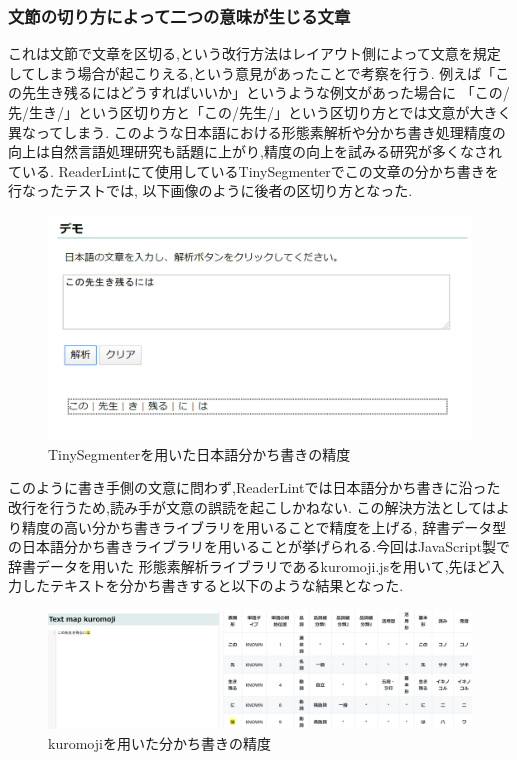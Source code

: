 \subsubsection{文節の切り方によって二つの意味が生じる文章}
これは文節で文章を区切る,という改行方法はレイアウト側によって文意を規定してしまう場合が起こりえる,という意見があったことで考察を行う.
例えば「この先生き残るにはどうすればいいか」というような例文があった場合に
「この/先/生き/」という区切り方と「この/先生/」という区切り方とでは文意が大きく異なってしまう.
このような日本語における形態素解析や分かち書き処理精度の向上は自然言語処理研究も話題に上がり,精度の向上を試みる研究が多くなされている.
ReaderLintにて使用しているTinySegmenterでこの文章の分かち書きを行なったテストでは,
以下画像のように後者の区切り方となった.
\begin{figure}[H]
    \centering
    \label{fig:seid}
    \includegraphics[width=0.7\columnwidth]{image/04/img2.png}
    \caption[TinySegmenterを用いた日本語分かち書きの精度] {TinySegmenterを用いた日本語分かち書きの精度}\footnotemark[1]
\end{figure}

このように書き手側の文意に問わず,ReaderLintでは日本語分かち書きに沿った改行を行うため,読み手が文意の誤読を起こしかねない.
この解決方法としてはより精度の高い分かち書きライブラリを用いることで精度を上げる,
辞書データ型の日本語分かち書きライブラリを用いることが挙げられる.今回はJavaScript製で辞書データを用いた
形態素解析ライブラリであるkuromoji.jsを用いて,先ほど入力したテキストを分かち書きすると以下のような結果となった.
\begin{figure}[H]
    \centering
    \label{fig:seid2}
    \includegraphics[width=0.7\columnwidth]{image/04/img3.png}
    \caption[kuromojiを用いた分かち書きの精度] {kuromojiを用いた分かち書きの精度}\footnotemark[2]
\end{figure}

